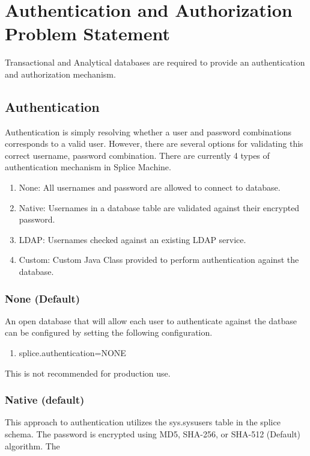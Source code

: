 \section{Authentication and Authorization Problem Statement}
Transactional and Analytical databases are required to provide an
authentication and authorization mechanism.

\subsection{Authentication}
Authentication is simply resolving whether a user and password combinations
corresponds to a valid user.  However, there are several options for validating
this correct username, password combination.  There are currently 4 types of
authentication mechanism in Splice Machine.

\begin{enumerate}
	\item None: All usernames and password are allowed to connect to database.
	\item Native: Usernames in a database table are validated against their
	encrypted password.
	\item LDAP: Usernames checked against an existing LDAP service.
	\item Custom: Custom Java Class provided to perform authentication against the
	database.
\end{enumerate}

\subsubsection{None (Default)}
An open database that will allow each user to authenticate against the datbase
can be configured by setting the following configuration.

\begin{enumerate}
	\item splice.authentication=NONE
\end{enumerate}

This is not recommended for production use.


\subsubsection{Native (default)}
This approach to authentication utilizes the sys.sysusers table in the splice
schema.  The password is encrypted using MD5, SHA-256, or
SHA-512 (Default) algorithm.  The 

